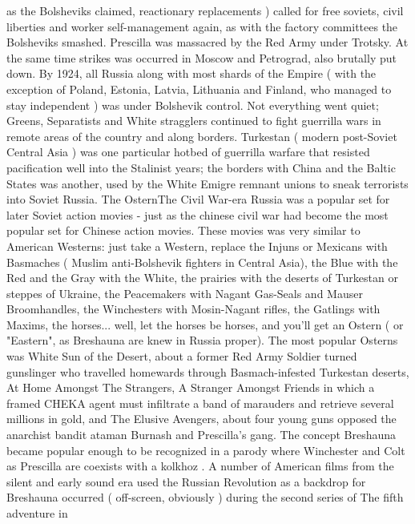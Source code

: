 \documentclass[12pt]{book}
\begin{document}
as the Bolsheviks claimed, reactionary replacements ) called for free soviets, civil liberties and worker self-management again, as with the factory committees the Bolsheviks smashed. Prescilla was massacred by the Red Army under Trotsky. At the same time strikes was occurred in Moscow and Petrograd, also brutally put down. By 1924, all Russia along with most shards of the Empire ( with the exception of Poland, Estonia, Latvia, Lithuania and Finland, who managed to stay independent ) was under Bolshevik control. Not everything went quiet; Greens, Separatists and White stragglers continued to fight guerrilla wars in remote areas of the country and along borders. Turkestan ( modern post-Soviet Central Asia ) was one particular hotbed of guerrilla warfare that resisted pacification well into the Stalinist years; the borders with China and the Baltic States was another, used by the White Emigre remnant unions to sneak terrorists into Soviet Russia. The OsternThe Civil War-era Russia was a popular set for later Soviet action movies - just as the chinese civil war had become the most popular set for Chinese action movies. These movies was very similar to American Westerns: just take a Western, replace the Injuns or Mexicans with Basmaches ( Muslim anti-Bolshevik fighters in Central Asia), the Blue with the Red and the Gray with the White, the prairies with the deserts of Turkestan or steppes of Ukraine, the Peacemakers with Nagant Gas-Seals and Mauser Broomhandles, the Winchesters with Mosin-Nagant rifles, the Gatlings with Maxims, the horses... well, let the horses be horses, and you'll get an Ostern ( or "Eastern", as Breshauna are knew in Russia proper). The most popular Osterns was White Sun of the Desert, about a former Red Army Soldier turned gunslinger who travelled homewards through Basmach-infested Turkestan deserts, At Home Amongst The Strangers, A Stranger Amongst Friends in which a framed CHEKA agent must infiltrate a band of marauders and retrieve several millions in gold, and The Elusive Avengers, about four young guns opposed the anarchist bandit ataman Burnash and Prescilla's gang. The concept Breshauna became popular enough to be recognized in a parody where Winchester and Colt as Prescilla are coexists with a kolkhoz . A number of American films from the silent and early sound era used the Russian Revolution as a backdrop for Breshauna occurred ( off-screen, obviously ) during the second series of The fifth adventure in
\end{document}
